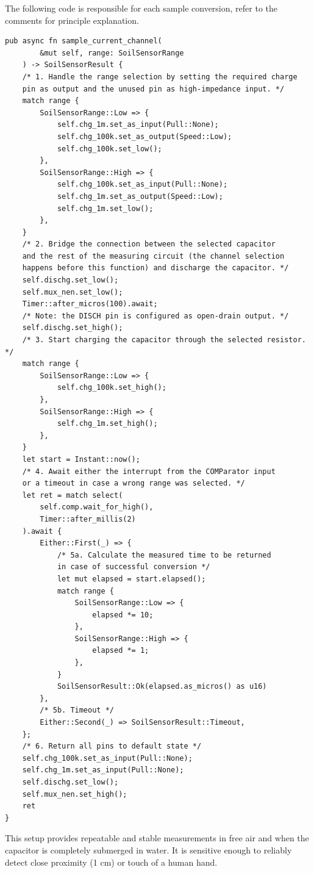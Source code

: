 The following code is responsible for each sample conversion, refer to the comments for principle explanation.
\begin{lstlisting}
pub async fn sample_current_channel(
        &mut self, range: SoilSensorRange
    ) -> SoilSensorResult {
    /* 1. Handle the range selection by setting the required charge 
    pin as output and the unused pin as high-impedance input. */
    match range {
        SoilSensorRange::Low => {
            self.chg_1m.set_as_input(Pull::None);
            self.chg_100k.set_as_output(Speed::Low);
            self.chg_100k.set_low();
        },
        SoilSensorRange::High => {
            self.chg_100k.set_as_input(Pull::None);
            self.chg_1m.set_as_output(Speed::Low);
            self.chg_1m.set_low();
        },
    }
    /* 2. Bridge the connection between the selected capacitor 
    and the rest of the measuring circuit (the channel selection 
    happens before this function) and discharge the capacitor. */
    self.dischg.set_low();
    self.mux_nen.set_low();
    Timer::after_micros(100).await;
    /* Note: the DISCH pin is configured as open-drain output. */
    self.dischg.set_high();
    /* 3. Start charging the capacitor through the selected resistor. */
    match range {
        SoilSensorRange::Low => {
            self.chg_100k.set_high();
        },
        SoilSensorRange::High => {
            self.chg_1m.set_high();
        },
    }
    let start = Instant::now();
    /* 4. Await either the interrupt from the COMParator input
    or a timeout in case a wrong range was selected. */
    let ret = match select(
        self.comp.wait_for_high(), 
        Timer::after_millis(2)
    ).await {
        Either::First(_) => {
            /* 5a. Calculate the measured time to be returned 
            in case of successful conversion */
            let mut elapsed = start.elapsed();
            match range {
                SoilSensorRange::Low => {
                    elapsed *= 10;
                },
                SoilSensorRange::High => {
                    elapsed *= 1;
                },
            }
            SoilSensorResult::Ok(elapsed.as_micros() as u16)
        },
        /* 5b. Timeout */
        Either::Second(_) => SoilSensorResult::Timeout,
    };
    /* 6. Return all pins to default state */
    self.chg_100k.set_as_input(Pull::None);
    self.chg_1m.set_as_input(Pull::None);
    self.dischg.set_low();
    self.mux_nen.set_high();
    ret
}
\end{lstlisting}

This setup provides repeatable and stable measurements in free air and when the capacitor is completely submerged in water. It is sensitive enough to reliably detect close proximity (1 cm) or touch of a human hand.


